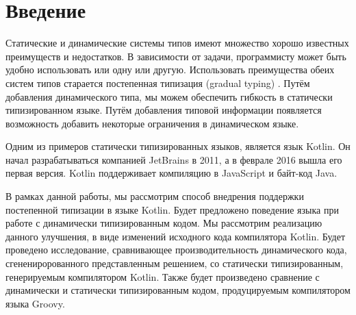 \section*{Введение}

Статические и динамические системы типов имеют множество хорошо известных преимуществ и недостатков. В зависимости от задачи, программисту может быть удобно использовать или одну или другую. Использовать преимущества обеих систем типов старается постепенная типизация (gradual typing) \cite{gradual:siek2006gradual}. Путём добавления динамического типа, мы можем обеспечить гибкость в статически типизированном языке. Путём добавления типовой информации появляется возможность добавить некоторые ограничения в динамическом языке.

Одним из примеров статически типизированных языков, является язык Kotlin. Он начал разрабатываться компанией JetBrains в 2011, а в феврале 2016 вышла его первая версия. Kotlin поддерживает компиляцию в JavaScript и байт-код Java.

В рамках данной работы, мы рассмотрим способ внедрения поддержки постепенной типизации в языке Kotlin. Будет предложено поведение языка при работе с динамически типизированным кодом. Мы рассмотрим реализацию данного улучшения, в виде изменений исходного кода компилятора Kotlin. Будет проведено исследование, сравнивающее производительность динамического кода, сгенениророванного представленным решением, со статически типизированным, генерируемым компилятором Kotlin. Также будет произведено сравнение с динамически и статически типизированным кодом, продуцируемым компилятором языка Groovy.



